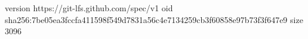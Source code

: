 version https://git-lfs.github.com/spec/v1
oid sha256:7be05ea3fccfa411598f549d7831a56c4e7134259cb3f60858e97b73f3f647e9
size 3096
